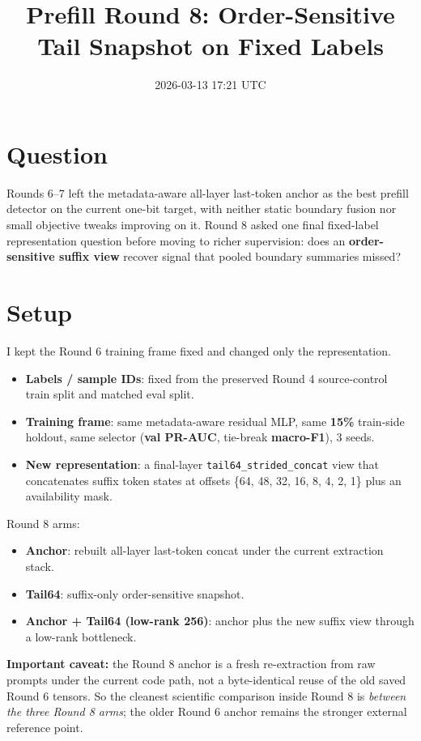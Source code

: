\documentclass[11pt]{article}
\title{Prefill Round 8: Order-Sensitive Tail Snapshot on Fixed Labels}
\author{}
\date{2026-03-13 17:21 UTC}
\begin{document}
\maketitle

\section*{Question}
Rounds 6--7 left the metadata-aware all-layer last-token anchor as the best prefill detector on the current one-bit target, with neither static boundary fusion nor small objective tweaks improving on it. Round 8 asked one final fixed-label representation question before moving to richer supervision: does an \textbf{order-sensitive suffix view} recover signal that pooled boundary summaries missed?

\section*{Setup}
I kept the Round 6 training frame fixed and changed only the representation.

\begin{itemize}
  \item \textbf{Labels / sample IDs}: fixed from the preserved Round 4 source-control train split and matched eval split.
  \item \textbf{Training frame}: same metadata-aware residual MLP, same \textbf{15\%} train-side holdout, same selector (\textbf{val PR-AUC}, tie-break \textbf{macro-F1}), 3 seeds.
  \item \textbf{New representation}: a final-layer \texttt{tail64\_strided\_concat} view that concatenates suffix token states at offsets \{64, 48, 32, 16, 8, 4, 2, 1\} plus an availability mask.
\end{itemize}

Round 8 arms:
\begin{itemize}
  \item \textbf{Anchor}: rebuilt all-layer last-token concat under the current extraction stack.
  \item \textbf{Tail64}: suffix-only order-sensitive snapshot.
  \item \textbf{Anchor + Tail64 (low-rank 256)}: anchor plus the new suffix view through a low-rank bottleneck.
\end{itemize}

\textbf{Important caveat:} the Round 8 anchor is a fresh re-extraction from raw prompts under the current code path, not a byte-identical reuse of the old saved Round 6 tensors. So the cleanest scientific comparison inside Round 8 is \emph{between the three Round 8 arms}; the older Round 6 anchor remains the stronger external reference point.
\end{document}

